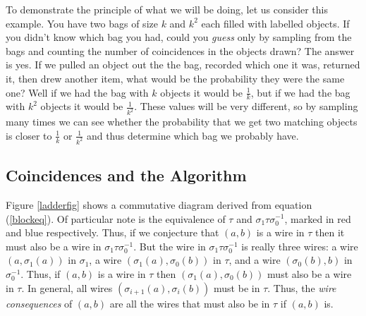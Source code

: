 \documentclass[12pt]{article}
\theoremstyle{definition}
\theoremstyle{remark}
\theoremstyle{remark}
\begin{document}
\par
To demonstrate the principle of what we will be doing, let us consider this example. You have two bags of size $k$ and $k^2$ each filled with labelled objects. If you didn't know which bag you had, could you \emph{guess} only by sampling from the bags and counting the number of coincidences in the objects drawn? The answer is yes. If we pulled an object out the the bag, recorded which one it was, returned it, then drew another item, what would be the probability they were the same one? Well if we had the bag with $k$ objects it would be $\frac{1}{k}$, but if we had the bag with $k^2$ objects it would be $\frac{1}{k^2}$. These values will be very different, so by sampling many times we can see whether the probability that we get two matching objects is closer to $\frac{1}{k}$ or $\frac{1}{k^2}$ and thus determine which bag we probably have.

\subsection{Coincidences and the Algorithm}
\par
Figure \ref{ladderfig} shows a commutative diagram derived from equation (\ref{blockeq}). Of particular note is the equivalence of $\tau$ and $\sigma_1 \tau \sigma^{-1}_0$, marked in red and blue respectively. Thus, if we conjecture that $(a,b)$ is a wire in $\tau$ then it must also be a wire in $\sigma_1 \tau \sigma^{-1}_0$. But the wire in $\sigma_1 \tau \sigma^{-1}_0$ is really three wires: a wire $(a,\sigma_1(a))$ in $\sigma_1$, a wire $(\sigma_1(a),\sigma_0(b))$ in $\tau$, and a wire $(\sigma_0(b), b)$ in $\sigma^{-1}_0$. Thus, if $(a,b)$ is a wire in $\tau$ then $(\sigma_1(a),\sigma_0(b))$ must also be a wire in $\tau$. In general, all wires $(\sigma_{i+1}(a),\sigma_i(b))$ must be in $\tau$. Thus, the \emph{wire consequences} of $(a,b)$ are all the wires that must also be in $\tau$ if $(a,b)$ is.
\end{document}
